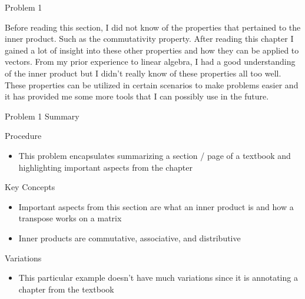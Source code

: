 \begin{problem}{Problem 1}
    \begin{Highlight}
        Before reading this section, I did not know of the properties that pertained to the inner product. Such as the commutativity property. After reading this chapter I gained a lot of insight
        into these other properties and how they can be applied to vectors. From my prior experience to linear algebra, I had a good understanding of the inner product but I didn't really know of
        these properties all too well. These properties can be utilized in certain scenarios to make problems easier and it has provided me some more tools that I can possibly use in the future.
    \end{Highlight}
\end{problem}

\begin{summary}{Problem 1 Summary}
    \begin{statement}{Procedure}
        \begin{itemize}
            \item This problem encapsulates summarizing a section / page of a textbook and highlighting important aspects from the chapter
        \end{itemize}
    \end{statement}
    \begin{statement}{Key Concepts}
        \begin{itemize}
            \item Important aspects from this section are what an inner product is and how a transpose works on a matrix
            \item Inner products are commutative, associative, and distributive
        \end{itemize}
    \end{statement}
    \begin{statement}{Variations}
        \begin{itemize}
            \item This particular example doesn't have much variations since it is annotating a chapter from the textbook
        \end{itemize}
    \end{statement}
\end{summary}

